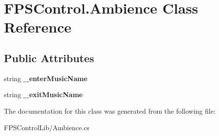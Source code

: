 \hypertarget{class_f_p_s_control_1_1_ambience}{\section{F\-P\-S\-Control.\-Ambience Class Reference}
\label{class_f_p_s_control_1_1_ambience}
}
\subsection*{Public Attributes}
\begin{DoxyCompactItemize}
\item 
\hypertarget{class_f_p_s_control_1_1_ambience_aafc277675d58c2cbad5908ccc4a2d6b2}{string {\bfseries \-\_\-enter\-Music\-Name}}\label{class_f_p_s_control_1_1_ambience_aafc277675d58c2cbad5908ccc4a2d6b2}

\item 
\hypertarget{class_f_p_s_control_1_1_ambience_a55700a9547a84a838782dc7b02806710}{string {\bfseries \-\_\-exit\-Music\-Name}}\label{class_f_p_s_control_1_1_ambience_a55700a9547a84a838782dc7b02806710}

\end{DoxyCompactItemize}


The documentation for this class was generated from the following file\-:\begin{DoxyCompactItemize}
\item 
F\-P\-S\-Control\-Lib/Ambience.\-cs\end{DoxyCompactItemize}
